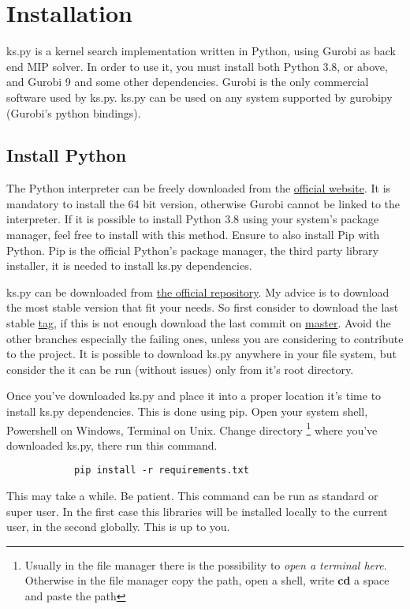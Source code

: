 
\section{Installation}

    ks.py is a kernel search implementation written in Python, using Gurobi as back end MIP solver. In order to use it, you must
    install both Python 3.8, or above, and  Gurobi 9 and some other dependencies. Gurobi is the only commercial software used by ks.py. 
    ks.py can be used on any system supported by gurobipy (Gurobi's python bindings).
    
    \subsection{Install Python}
        The Python interpreter can be freely downloaded from the \href{https://www.python.org/}{official website}. It is mandatory to install 
        the 64 bit version, otherwise Gurobi cannot be linked to the interpreter. If it is possible to install Python 3.8 using your system's
        package manager, feel free to install with this method. Ensure to also install Pip with Python. Pip is the official Python's package manager,
        the third party library installer, it is needed to install ks.py dependencies.

        ks.py can be downloaded from \href{https://github.com/FilippoRanza/ks.py}{the official repository}. My advice is to download the most stable 
        version that fit your needs. So first consider to download the last stable \href{https://github.com/FilippoRanza/ks.py/releases}{tag}, if this is not enough download the last commit on 
        \href{https://github.com/FilippoRanza/ks.py/archive/master.zip}{master}. Avoid 
        the other branches especially the failing ones, unless you are considering to contribute to the project. It is possible to download ks.py anywhere 
        in your file system, but consider the it can be run (without issues) only from it's root directory.

        Once you've downloaded ks.py and place it into a proper location it's time to install ks.py dependencies. This is done using pip. 
        Open your system shell, Powershell on Windows, Terminal on Unix. Change directory \footnote{Usually in the file manager there is the possibility 
        to \emph{open a terminal here}. Otherwise in the file manager copy the path, open a shell, write \textbf{cd} a space and paste the path} where you've downloaded ks.py, there run this 
        command. 
        \begin{lstlisting}
            pip install -r requirements.txt
        \end{lstlisting}
        This may take a while. Be patient. This command can be run as standard or super user. In the first case this libraries will be installed locally to the 
        current user, in the second globally. This is up to you.

